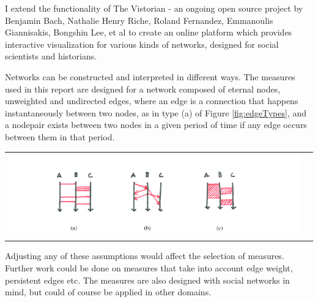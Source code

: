 I extend the functionality of The Vistorian \cite{bach:hal-01205822} - an ongoing open source project by Benjamin Bach, Nathalie Henry Riche, Roland Fernandez, Emmanoulis Giannisakis, Bongshin Lee, et al to create an online platform which provides interactive visualization for various kinds of networks, designed for social scientists and historians. 

Networks can be constructed and interpreted in different ways. The measures used in this report are designed for a network composed of eternal nodes, unweighted and undirected edges, where an edge is a connection that happens instantaneously between two nodes, as in type (a) of Figure \ref{fig:edgeTypes}, and a nodepair exists between two nodes in a given period of time if any edge occurs between them in that period. 

\begin{center}
\begin{tabular}{cc}
\includegraphics[trim={0 0 0 0}, width=140mm]{./Figures/edgeTypes.png}
\end{tabular}
\label{fig:edgeTypes}
\end{center}


Adjusting any of these assumptions would affect the selection of measures. Further work could be done on measures that take into account edge weight, persistent edges etc. The measures are also designed with social networks in mind, but could of course be applied in other domains.



